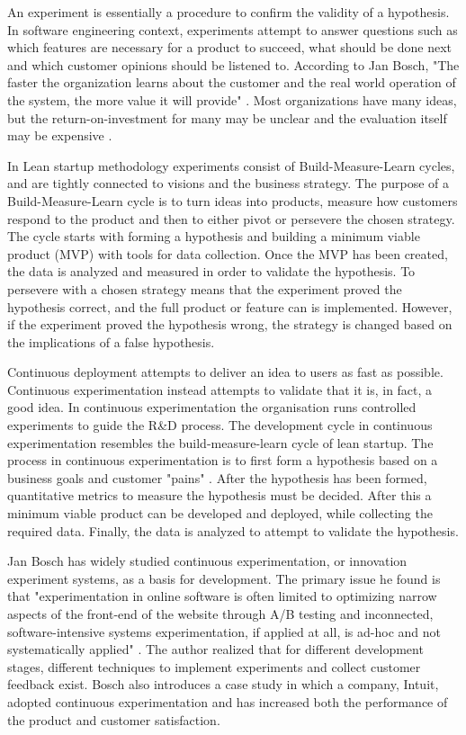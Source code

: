 \documentclass[english]{tktltiki2}
\theoremstyle{definition}
\theoremstyle{remark}
\begin{document}
An experiment is essentially a procedure to confirm the validity of a hypothesis. In software engineering context, experiments attempt to answer questions such as which features are necessary for a product to succeed, what should be done next and which customer opinions should be listened to. According to Jan Bosch, "The faster the organization learns about the customer and the real world operation of the system, the more value it will provide" \cite{bosch2012building}. Most organizations have many ideas, but the return-on-investment for many may be unclear and the evaluation itself may be expensive \cite{kohavi2007practical}. 

In Lean startup methodology \cite{ries2011lean} experiments consist of Build-Measure-Learn cycles, and are tightly connected to visions and the business strategy. The purpose of a Build-Measure-Learn cycle is to turn ideas into products, measure how customers respond to the product and then to either pivot or persevere the chosen strategy. The cycle starts with forming a hypothesis and building a minimum viable product (MVP) with tools for data collection. Once the MVP has been created, the data is analyzed and measured in order to validate the hypothesis. To persevere with a chosen strategy means that the experiment proved the hypothesis correct, and the full product or feature can is implemented. However, if the experiment proved the hypothesis wrong, the strategy is changed based on the implications of a false hypothesis.

Continuous deployment attempts to deliver an idea to users as fast as possible. Continuous experimentation instead attempts to validate that it is, in fact, a good idea. In continuous experimentation the organisation runs controlled experiments to guide the R\&D process. The development cycle in continuous experimentation resembles the build-measure-learn cycle of lean startup. The process in continuous experimentation is to first form a hypothesis based on a business goals and customer "pains" \cite{bosch2012building}. After the hypothesis has been formed, quantitative metrics to measure the hypothesis must be decided. After this a minimum viable product can be developed and deployed, while collecting the required data. Finally, the data is analyzed to attempt to validate the hypothesis.

Jan Bosch has widely studied continuous experimentation, or innovation experiment systems, as a basis for development. The primary issue he found is that "experimentation in online software is often limited to optimizing narrow aspects of the front-end of the website through A/B testing and inconnected, software-intensive systems experimentation, if applied at all, is ad-hoc and not systematically applied" \cite{bosch2012building}. The author realized that for different development stages, different techniques to implement experiments and collect customer feedback exist. Bosch also introduces a case study in which a company, Intuit, adopted continuous experimentation and has increased both the performance of the product and customer satisfaction.
\end{document}

